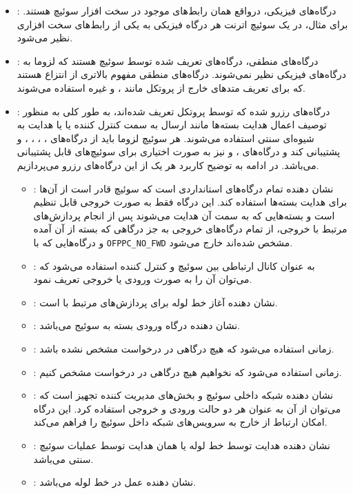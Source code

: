 \begin{itemize}
	\item
{}:
درگاه‌های فیزیکی، درواقع همان رابط‌های موجود در سخت افزار سوئیچ هستند. برای مثال، در یک سوئیچ اترنت هر درگاه فیزیکی به یکی از رابط‌های سخت افزاری نظیر می‌شود.
	\item
{}:
درگاه‌های منطقی، درگاه‌های تعریف شده توسط سوئیچ هستند که لزوما به درگاه‌های فیزیکی نظیر نمی‌شوند. درگاه‌های منطقی مفهوم بالاتری از انتزاع هستند که برای تعریف متد‌های خارج از پروتکل  مانند ،  و غیره استفاده می‌شوند.
	\item
{}:
درگاه‌های رزرو شده که توسط پروتکل تعریف شده‌اند، به طور کلی به منظور توصیف اعمال هدایت بسته‌ها مانند ارسال به سمت کنترل کننده یا  یا هدایت به شیوه‌ای سنتی  استفاده می‌شوند. هر سوئیچ  لزوما باید از درگاه‌های ، ، ، ،  و  پشتیبانی کند و درگاه‌های ،  و  نیز به صورت اختیاری برای سوئیچ‌های  قابل پشتیبانی می‌باشد. در ادامه به توضیح کاربرد هر یک از این درگاه‌های رزرو می‌پردازیم.
\begin{itemize}
	\item {}:
نشان دهنده تمام درگاه‌های استانداردی است که سوئیچ قادر است از آن‌ها برای هدایت بسته‌ها استفاده کند. این درگاه فقط به صورت خروجی قابل تنظیم است و بسته‌هایی که به سمت آن هدایت می‌شوند پس از انجام پردازش‌های مرتبط با خروجی، از تمام درگاه‌های خروجی به جز درگاهی که بسته از آن آمده و درگاه‌هایی که با \texttt{OFPPC\_NO\_FWD} مشخص شده‌اند خارج می‌شود.
	\item {}:
به عنوان کانال ارتباطی بین سوئیچ و کنترل کننده استفاده می‌شود که می‌توان آن را به صورت ورودی یا خروجی تعریف نمود.
	\item {}:
نشان دهنده آغاز خط لوله برای پردازش‌های مرتبط با  است.
	\item {}:
نشان دهنده درگاه ورودی بسته به سوئیج می‌باشد.
	\item {}:
زمانی استفاده می‌شود که هیچ درگاهی در درخواست  مشخص نشده باشد.
	\item {}:
زمانی استفاده می‌شود که نخواهیم هیچ درگاهی در درخواست  مشخص کنیم.
	\item {}:
نشان دهنده شبکه داخلی سوئیچ و بخش‌های مدیریت کننده تجهیز است که می‌توان از آن به عنوان هر دو حالت ورودی و خروجی استفاده کرد. این درگاه امکان ارتباط از خارج به سرویس‌های شبکه داخل سوئیچ  را فراهم می‌کند.
	\item {}:
نشان دهنده هدایت توسط خط لوله  یا همان هدایت توسط عملیات سوئیچ سنتی می‌باشد.
	\item {}:
نشان دهنده عمل  در خط لوله  می‌باشد.
\end{itemize}
\end{itemize}


